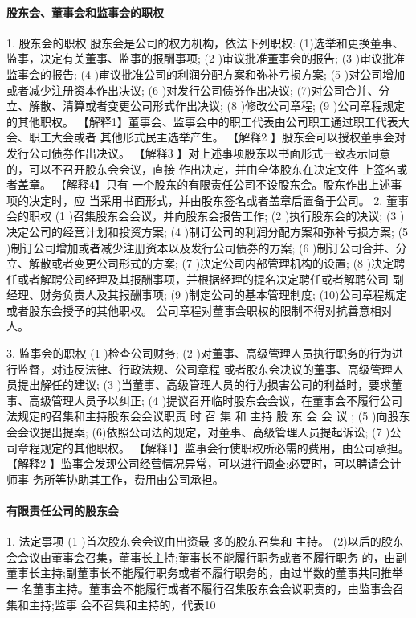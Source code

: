 \documentclass[UTF8,12pt]{ctexart}
\numberwithin{equation}{section} %
\numberwithin{figure}{section}
\numberwithin{table}{section}
\begin{document}
	\paragraph{股东会、董事会和监事会的职权}
	1. 股东会的职权
	股东会是公司的权力机构，依法下列职权: (1)选举和更换董事、监事，决定有关董事、监事的报酬事项; (2 )审议批准董事会的报告;
	(3 )审议批准监事会的报告;
	(4 )审议批准公司的利润分配方案和弥补亏损方案;
	(5 )对公司增加或者减少注册资本作出决议;
	(6 )对发行公司债券作出决议; (7)对公司合并、分立、解散、清算或者变更公司形式作出决议; (8 )修改公司章程;
	(9 )公司章程规定的其他职权。
	【解释1】董事会、监事会中的职工代表由公司职工通过职工代表大会、职工大会或者 其他形式民主选举产生。
	【解释2 】股东会可以授权董事会对发行公司债券作出决议。
	【解释3 】对上述事项股东以书面形式一致表示同意的，可以不召开股东会会议，直接 作出决定，并由全体股东在决定文件 上签名或者盖章。
	【解释4】只有 一个股东的有限责任公司不设股东会。股东作出上述事项的决定时，应 当采用书面形式，并由股东签名或者盖章后置备于公司。
	2. 董事会的职权
	(1 )召集股东会会议，并向股东会报告工作;
	(2 )执行股东会的决议;
	(3 )决定公司的经营计划和投资方案;
	(4 )制订公司的利润分配方案和弥补亏损方案;
	(5 )制订公司增加或者减少注册资本以及发行公司债券的方案;
	(6 )制订公司合并、分立、解散或者变更公司形式的方案;
	(7 )决定公司内部管理机构的设置;
	(8 )决定聘任或者解聘公司经理及其报酬事项，并根据经理的提名决定聘任或者解聘公司 副经理、财务负责人及其报酬事项;
	(9 )制定公司的基本管理制度;
	(10)公司章程规定或者股东会授予的其他职权。 公司章程对董事会职权的限制不得对抗善意相对人。
	
	3. 监事会的职权
	(1 )检查公司财务;
	(2 )对董事、高级管理人员执行职务的行为进行监督，对违反法律、行政法规、公司章程 或者股东会决议的董事、高级管理人员提出解任的建议;
	(3 )当董事、高级管理人员的行为损害公司的利益时，要求董事、高级管理人员予以纠正; (4 )提议召开临时股东会会议，在董事会不履行公司法规定的召集和主持股东会会议职责 时 召 集 和 主持 股 东 会 会 议 ;
	(5 )向股东会会议提出提案; (6)依照公司法的规定，对董事、高级管理人员提起诉讼;
	(7 )公司章程规定的其他职权。
	【解释1】监事会行使职权所必需的费用，由公司承担。
	【解释2 】监事会发现公司经营情况异常，可以进行调查;必要时，可以聘请会计师事 务所等协助其工作，费用由公司承担。
	
	\paragraph{ 有限责任公司的股东会}
	1. 法定事项
	(1 )首次股东会会议由出资最 多的股东召集和 主持。 (2)以后的股东会会议由董事会召集，董事长主持;董事长不能履行职务或者不履行职务 的，由副董事长主持;副董事长不能履行职务或者不履行职务的，由过半数的董事共同推举一 名董事主持。董事会不能履行或者不履行召集股东会会议职责的，由监事会召集和主持;监事 会不召集和主持的，代表10%
	
\end{document}
